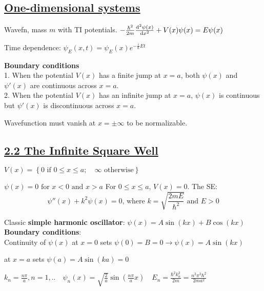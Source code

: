 \subsection{\underline{One-dimensional systems}}
Wavefn, mass $m$ with TI potentials.
    $- \frac{\hbar^2}{2m} \dv[2]{\psi(x)}{x} + V(x) \psi(x) = E \psi(x)$

Time dependence: $\psi_E(x, t) = \psi_E(x) e^{-\frac{i}{\hbar} E t}$

\textbf{Boundary conditions} \\
1. When the potential $V(x)$ has a finite jump at $x = a$, both $\psi(x)$ and $\psi'(x)$ are continuous across $x = a$. \\
2. When the potential $V(x)$ has an infinite jump at $x = a$, $\psi(x)$ is continuous but $\psi'(x)$ is discontinuous across $x = a$.

Wavefunction must vanish at $x = \pm \infty$ to be normalizable.

\subsection{\underline{2.2 The Infinite Square Well}}

$V(x) = \left\{ 0 \textrm{ if } 0 \leq x \leq a; \quad \infty \textrm{ otherwise} \right\}$


$\psi(x) = 0 \textrm{ for } x < 0 \textrm{ and } x > a$
For $0 \leq x \leq a$, $V(x) = 0$. The SE: 
    $$\psi''(x) + k^2 \psi(x) = 0 \textrm{, where } k = \sqrt{\frac{2mE}{\hbar^2}} \textrm{ and } E > 0$$

Classic \textbf{simple harmonic oscillator}: $\psi(x) = A \sin(kx) + B \cos(kx)$ \\

\textbf{Boundary conditions}: \\
Continuity of $\psi(x)$ at $x = 0$ sets $\psi(0) = B = 0 \rightarrow \psi(x) = A \sin(kx)$

at $x = a$ sets $\psi(a) = A \sin(ka) = 0$

$k_n = \frac{n \pi}{a}, n = 1,.. \quad \psi_n(x) = \sqrt{\frac{2}{a}} \sin(\frac{n \pi}{a} x) \quad E_n = \frac{\hbar^2 k_n^2}{2m} = \frac{n^2 \pi^2 \hbar^2}{2ma^2}$

